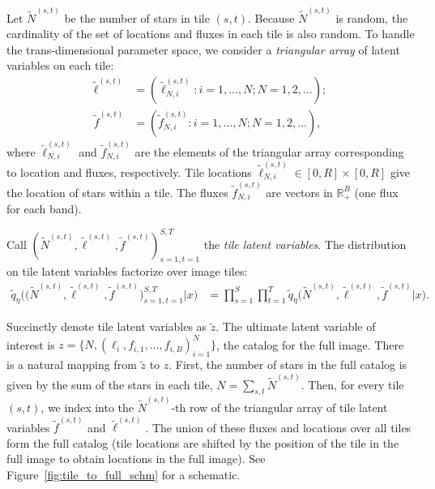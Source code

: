 Let $\tilde N^{(s, t)}$ be the number of stars in tile $(s,t)$.
Because $\tilde N^{(s, t)}$ is random,
the cardinality of the set of locations and fluxes in each tile
is also random.
To handle the trans-dimensional parameter space,
we consider a {\itshape triangular array} of latent variables
on each tile:
\begin{align}
    \tilde\ell^{(s, t)} &= (\tilde\ell_{N, i}^{(s, t)} : i = 1, ..., N; N = 1, 2, ...); \\
    \tilde f^{(s, t)} &= (\tilde f_{N, i}^{(s, t)} : i = 1, ..., N; N = 1, 2, ...),
\end{align}
where $\tilde\ell_{N, i}^{(s, t)}$ and $\tilde f_{N, i}^{(s, t)}$ are the elements of the triangular array corresponding to location and fluxes, respectively.
Tile locations $\tilde\ell_{N, i}^{(s, t)} \in [0, R]\times[0, R]$ give the location of stars within a tile. The fluxes $\tilde f_{N, i}^{(s, t)}$ are vectors in $\mathbb{R}^B_+$ (one flux for each band).

Call $(\tilde N^{(s, t)}, \tilde \ell^{(s, t)}, \tilde f^{(s, t)})_{s=1,t=1}^{S,T}$ the {\itshape tile latent variables}. The distribution on tile latent variables factorize over image tiles:
\begin{align}
    \tilde q_\eta\big( \big(\tilde N^{(s, t)}, \tilde \ell^{(s, t)}, \tilde f^{(s, t)}\big)_{s=1, t = 1}^{S, T}|x\big)
    &=
    \prod_{s = 1}^S \prod_{t=1}^T
    \tilde q_\eta\big(\tilde N^{(s, t)}, \tilde \ell^{(s, t)}, \tilde f^{(s, t)} | x\big).
    \label{eq:factorize_patches}
\end{align}

Succinctly denote tile latent variables as $\tilde z$.
The ultimate latent variable of interest is $z = \{N, (\ell_i, f_{i,1}, ..., f_{i,B})_{i = 1}^N\}$, the catalog for the full image.
There is a natural mapping from $\tilde z$ to $z$.
First, the number of stars in the full catalog is given by the sum of the stars in each tile, $N = \sum_{s,t} \tilde N^{(s, t)}$.
Then, for every tile $(s,t)$, we index into the $\tilde N^{(s,t)}$-th row of the triangular array of tile latent variables $\tilde f^{(s,t)}$ and $\tilde \ell^{(s,t)}$.
The union of these fluxes and locations over all tiles form the full catalog (tile locations are shifted by the position of the tile in the full image to obtain locations in the full image).
See Figure~\ref{fig:tile_to_full_schm} for a schematic.




